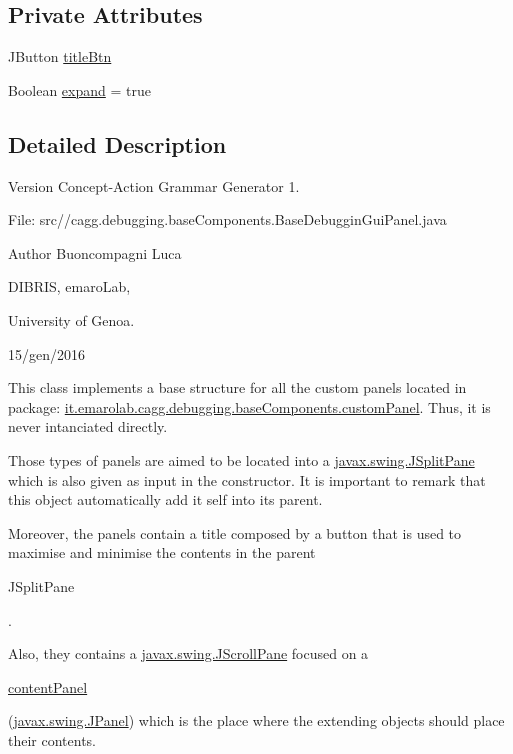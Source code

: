 \subsection*{Private Attributes}
\begin{DoxyCompactItemize}
\item 
J\-Button \hyperlink{classit_1_1emarolab_1_1cagg_1_1debugging_1_1baseComponents_1_1BaseDebugginGuiPanel_a1a9867ee7d235de1a696c9e6c83a90a7}{title\-Btn}
\item 
Boolean \hyperlink{classit_1_1emarolab_1_1cagg_1_1debugging_1_1baseComponents_1_1BaseDebugginGuiPanel_a73c0cec164dbf05a9ec5ae33baa99b57}{expand} = true
\end{DoxyCompactItemize}


\subsection{Detailed Description}
\begin{DoxyVersion}{Version}
Concept-\/\-Action Grammar Generator 1. \par
 File\-: src//cagg.debugging.\-base\-Components.\-Base\-Debuggin\-Gui\-Panel.\-java \par

\end{DoxyVersion}
\begin{DoxyAuthor}{Author}
Buoncompagni Luca \par
 D\-I\-B\-R\-I\-S, emaro\-Lab,\par
 University of Genoa. \par
 15/gen/2016 \par

\end{DoxyAuthor}


This class implements a base structure for all the custom panels located in package\-: \hyperlink{namespaceit_1_1emarolab_1_1cagg_1_1debugging_1_1baseComponents_1_1customPanel}{it.\-emarolab.\-cagg.\-debugging.\-base\-Components.\-custom\-Panel}. Thus, it is never intanciated directly.\par
 Those types of panels are aimed to be located into a \hyperlink{}{javax.\-swing.\-J\-Split\-Pane} which is also given as input in the constructor. It is important to remark that this object automatically add it self into its parent.\par
 Moreover, the panels contain a title composed by a button that is used to maximise and minimise the contents in the parent
\begin{DoxyCode}
JSplitPane 
\end{DoxyCode}
 .\par
 Also, they contains a \hyperlink{}{javax.\-swing.\-J\-Scroll\-Pane} focused on a
\begin{DoxyCode}
\hyperlink{classit_1_1emarolab_1_1cagg_1_1debugging_1_1baseComponents_1_1BaseDebugginGuiPanel_a20dd485862372d4f536e47f201386c32}{contentPanel} 
\end{DoxyCode}
 (\hyperlink{}{javax.\-swing.\-J\-Panel}) which is the place where the extending objects should place their contents. 

